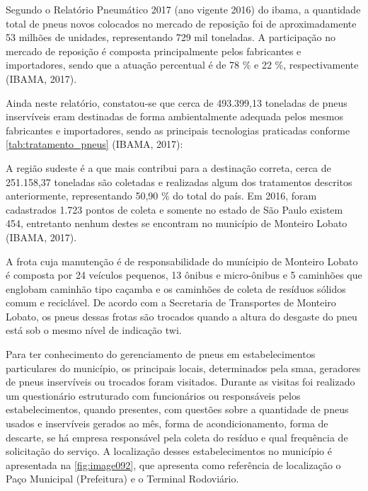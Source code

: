\begin{description}
	Segundo o Relatório Pneumático 2017 (ano vigente 2016) do \gls{ibama}, a quantidade total de pneus novos colocados no mercado de reposição foi de aproximadamente 53 milhões de unidades, representando 729 mil toneladas. A participação no mercado de reposição é composta principalmente pelos fabricantes e importadores, sendo que a atuação percentual é de 78 \% e 22 \%, respectivamente (IBAMA, 2017).
	
	Ainda neste relatório, constatou-se que cerca de 493.399,13 toneladas de pneus inservíveis eram destinadas de forma ambientalmente adequada pelos mesmos fabricantes e importadores, sendo as principais tecnologias praticadas conforme \autoref{tab:tratamento_pneus} (IBAMA, 2017):	
	
	
	
	A região sudeste é a que mais contribui para a destinação correta, cerca de 251.158,37 toneladas são coletadas e realizadas algum dos tratamentos descritos anteriormente, representando 50,90 \% do total do país. Em 2016, foram cadastrados 1.723 pontos de coleta e somente no estado de São Paulo existem 454, entretanto nenhum destes se encontram no município de Monteiro Lobato (IBAMA, 2017).
	
	A frota cuja manutenção é de responsabilidade do munícipio de Monteiro Lobato é composta por 24 veículos pequenos, 13 ônibus e micro-ônibus e 5 caminhões que englobam caminhão tipo caçamba e os caminhões de coleta de resíduos sólidos comum e reciclável. De acordo com a Secretaria de Transportes de Monteiro Lobato, os pneus dessas frotas são trocados quando a altura do desgaste do pneu está sob o mesmo nível de indicação \gls{twi}.
	
	Para ter conhecimento do gerenciamento de pneus em estabelecimentos particulares do município, os principais locais, determinados pela \gls{smaa}, geradores de pneus inservíveis ou trocados foram visitados. Durante as visitas foi realizado um questionário estruturado com funcionários ou responsáveis pelos estabelecimentos, quando presentes, com questões sobre a quantidade de pneus usados e inservíveis gerados ao mês, forma de acondicionamento, forma de descarte, se há empresa responsável pela coleta do resíduo e qual frequência de solicitação do serviço. A localização desses estabelecimentos no município é apresentada na \autoref{fig:image092}, que apresenta como referência de localização o Paço Municipal (Prefeitura) e o Terminal Rodoviário.
	

\end{description}

